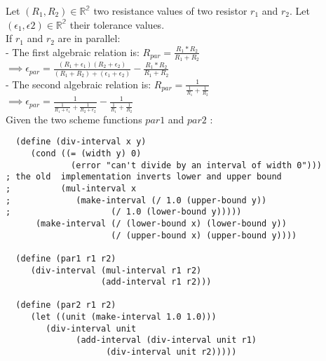 \documentclass{article}
\begin{document}
\noindent Let $ (R_1,R_2) \in \mathbb{R^2} $ two resistance values of two resistor $r_1$ and $r_2$. Let $ (\epsilon_1,\epsilon2) \in \mathbb{R^2} $ their tolerance values.\\
If $r_1$ and $r_2$ are in parallel: \\
- The first algebraic relation is: $ R_{par} = \frac{R_1*R_2}{R_1 + R_2} $\\
$\implies \epsilon_{par} =  \frac{(R_1+\epsilon_1)(R_2+\epsilon_2)}{(R_1 + R_2) + (\epsilon_1 + \epsilon_2)} -  \frac{R_1*R_2}{R_1 + R_2} $\\
- The second algebraic relation is: $R_{par} = \frac{1}{\frac{1}{R_1} + \frac{1}{R_2}} $\\
$\implies \epsilon_{par} =  \frac{1}{\frac{1}{R_1+\epsilon_1} + \frac{1}{R_2+\epsilon_2}} - \frac{1}{\frac{1}{R_1} + \frac{1}{R_2}}$\\
Given the two scheme functions $par1$ and $par2$ :\\
\begin{lstlisting}
  (define (div-interval x y)
     (cond ((= (width y) 0)
             (error "can't divide by an interval of width 0")))
; the old  implementation inverts lower and upper bound
;          (mul-interval x
;	          (make-interval (/ 1.0 (upper-bound y))
;	           		 (/ 1.0 (lower-bound y)))))
      (make-interval (/ (lower-bound x) (lower-bound y))
                     (/ (upper-bound x) (upper-bound y))))
  
  (define (par1 r1 r2)
     (div-interval (mul-interval r1 r2)
                   (add-interval r1 r2)))

  (define (par2 r1 r2)
     (let ((unit (make-interval 1.0 1.0)))
        (div-interval unit
		      (add-interval (div-interval unit r1)
				    (div-interval unit r2)))))
\end{lstlisting}
\end{document}
